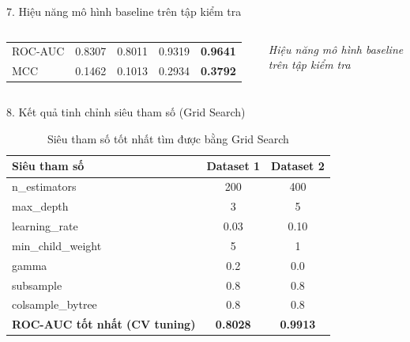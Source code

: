 \documentclass[aspectratio=169,11pt]{beamer}
\begin{document}
\begin{frame}{7. Hiệu năng mô hình baseline trên tập kiểm tra}
\begin{columns}[T]
\begin{tabular}{lcccc}
			ROC-AUC
			& 0.8307
			& 0.8011
			& 0.9319
			& \textbf{0.9641} \\
			
			MCC
			& 0.1462
			& 0.1013
			& 0.2934
			& \textbf{0.3792} \\
			
			\hline
		\end{tabular}
		
		\vspace{0.15cm}
		
		\small
		\textit{Hiệu năng mô hình baseline trên tập kiểm tra}
		
	\end{columns}
	
\end{frame}

\begin{frame}{8. Kết quả tinh chỉnh siêu tham số (Grid Search)}
	\begin{table}[h]
		\centering
		\caption{Siêu tham số tốt nhất tìm được bằng Grid Search}
		\label{tab:grid_search_params}
		\vspace{0.2cm} %
		\begin{tabular}{lcc}
			\toprule
			\textbf{Siêu tham số} & \textbf{Dataset 1} & \textbf{Dataset 2} \\
			\midrule
			n\_estimators & 200 & 400 \\
			max\_depth & 3 & 5 \\
			learning\_rate & 0.03 & 0.10 \\
			min\_child\_weight & 5 & 1 \\
			gamma & 0.2 & 0.0 \\
			subsample & 0.8 & 0.8 \\
			colsample\_bytree & 0.8 & 0.8 \\
			\midrule
			\textbf{ROC-AUC tốt nhất (CV tuning)} & \textbf{0.8028} & \textbf{0.9913} \\
			\bottomrule
		\end{tabular}
	\end{table}
\end{frame}
\end{document}
